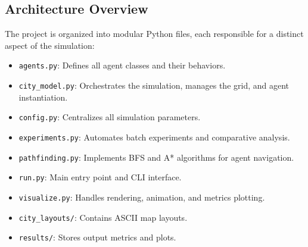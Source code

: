\documentclass[12pt,a4paper]{article}
\begin{document}
\subsection*{Architecture Overview}
The project is organized into modular Python files, each responsible for a distinct aspect of the simulation:
\begin{itemize}
    \item \texttt{agents.py}: Defines all agent classes and their behaviors.
    \item \texttt{city_model.py}: Orchestrates the simulation, manages the grid, and agent instantiation.
    \item \texttt{config.py}: Centralizes all simulation parameters.
    \item \texttt{experiments.py}: Automates batch experiments and comparative analysis.
    \item \texttt{pathfinding.py}: Implements BFS and A* algorithms for agent navigation.
    \item \texttt{run.py}: Main entry point and CLI interface.
    \item \texttt{visualize.py}: Handles rendering, animation, and metrics plotting.
    \item \texttt{city_layouts/}: Contains ASCII map layouts.
    \item \texttt{results/}: Stores output metrics and plots.
\end{itemize}
\end{document}
